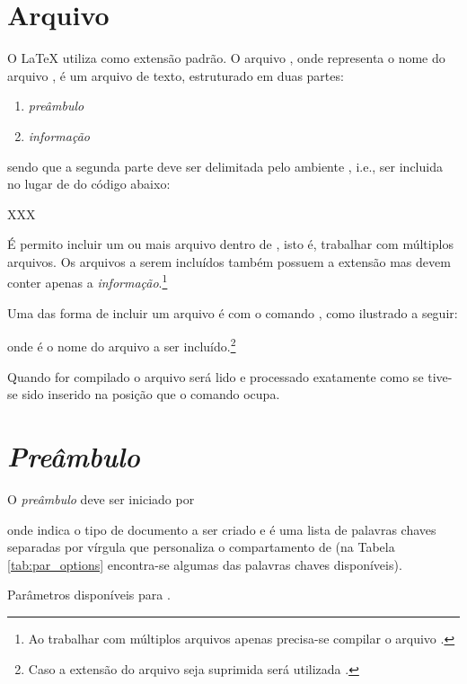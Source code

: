 \section{Arquivo } \label{sse:basic:tex}
O LaTeX utiliza  como extensão padrão. O arquivo , onde  representa o nome do arquivo , é um arquivo de texto, estruturado em duas partes:
\begin{enumerate}
    \item \emph{preâmbulo}
    \item \emph{informação}
\end{enumerate}
sendo que a segunda parte deve ser delimitada pelo ambiente , i.e., ser incluida no lugar de  do código abaixo:
\begin{code}

XXX

\end{code}

\'{E} permito incluir um ou mais arquivo dentro de , isto é, trabalhar com múltiplos arquivos. Os arquivos a serem incluídos também possuem a extensão  mas devem conter apenas a \emph{informação}.\footnote{Ao trabalhar com múltiplos arquivos apenas precisa-se compilar o arquivo .}

Uma das forma de incluir um arquivo é com o comando \lstinline!!, como ilustrado a seguir:
\begin{code}

\end{code}
onde  é o nome do arquivo a ser incluído.\footnote{Caso a extens\~{a}o do arquivo seja suprimida ser\'{a} utilizada .}

Quando  for compilado o arquivo  será lido e processado exatamente como se tive-se sido inserido na posição que o comando \lstinline!! ocupa.

\section{\emph{Preâmbulo}} \label{sse:basic:preamble}
O \emph{preâmbulo} deve ser iniciado por
onde  indica o tipo de documento a ser criado e  \'{e} uma lista de palavras chaves separadas por v\'{i}rgula que personaliza o compartamento de  (na Tabela \ref{tab:par_options} encontra-se algumas das palavras chaves disponíveis).
\begin{table}[h!tb]
    \centering
    \caption{Parâmetros disponíveis para .} \label{tab:par_options}
    
\end{table}

